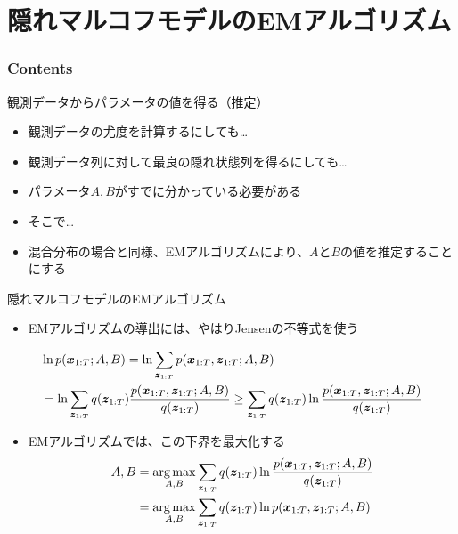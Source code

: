 \documentclass[aspectratio=169,unicode,dvipdfmx,14pt]{beamer}
\begin{document}
\section{隠れマルコフモデルのEMアルゴリズム}

\begin{frame}\frametitle{Contents}
\Large \tableofcontents[currentsection]
\end{frame}

\begin{frame}{観測データからパラメータの値を得る（推定）}
\begin{itemize}
\item 観測データの尤度を計算するにしても…
\item 観測データ列に対して最良の隠れ状態列を得るにしても…
\item パラメータ$A, B$がすでに分かっている必要がある
\item そこで…
\item 混合分布の場合と同様、EMアルゴリズムにより、$A$と$B$の値を推定することにする
\end{itemize}
\end{frame}


\begin{frame}{隠れマルコフモデルのEMアルゴリズム}
\begin{itemize}
\item EMアルゴリズムの導出には、やはりJensenの不等式を使う
\end{itemize}
\vspace{-.1in}
\begin{align}
& \ln p(\bm{x}_{1:T};A,B) = \ln \sum_{\bm{z}_{1:T}} p(\bm{x}_{1:T}, \bm{z}_{1:T};A,B)
\notag \\ &
= \ln \sum_{\bm{z}_{1:T}} q(\bm{z}_{1:T}) \frac{ p(\bm{x}_{1:T}, \bm{z}_{1:T};A,B) }{ q(\bm{z}_{1:T}) }
\geq \sum_{\bm{z}_{1:T}} q(\bm{z}_{1:T}) \ln \frac{ p(\bm{x}_{1:T}, \bm{z}_{1:T};A,B) }{ q(\bm{z}_{1:T}) }
\end{align}
\vspace{-.5in}
\begin{itemize}
\item EMアルゴリズムでは、この下界を最大化する
\begin{align}
A,B & = \operatorname*{arg\,max}_{A,B} \sum_{\bm{z}_{1:T}} q(\bm{z}_{1:T}) \ln \frac{ p(\bm{x}_{1:T}, \bm{z}_{1:T};A,B) }{ q(\bm{z}_{1:T}) }
\notag \\ &
= \operatorname*{arg\,max}_{A,B} \sum_{\bm{z}_{1:T}} q(\bm{z}_{1:T}) \ln p(\bm{x}_{1:T}, \bm{z}_{1:T};A,B)
\end{align}
\end{itemize}
\end{frame}
\end{document}
